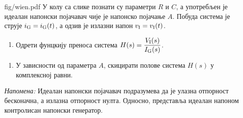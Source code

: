\mnDifficult
\begin{slikaDesno}{fig/wien.pdf}
    \PID 
    У колу са слике познати су параметри $R$ и $C$, а употребљен је идеалан напонски појачавач чије је 
    напонско појачање $A$. Побуда система је струје $i_{\rm G} = i_{\rm G}(t)$, а одзив је 
    излазни напон $v_{\rm I} = v_{\rm I}(t)$.
    \begin{enumerate}[label = (\alph*)]
        \item Одрети фунцкију преноса система $H(s) = \dfrac{V_{\rm I}(s)}{I_{\rm G}(s)}$. 
    \end{enumerate}
\end{slikaDesno}
\begin{enumerate}[label=(\alph*)]
    \item У зависности од параметра $A$, скицирати полове система $H(s)$ у комплексној равни. 
\end{enumerate}
\textit{Напомена:} Идеалан напонски 
појачавач подразумева да је улазна отпорност бесконачна, а излазна отпорност нулта. Односно, представља 
идеалан напоном контролисан напонски генератор.

\RESENJE

